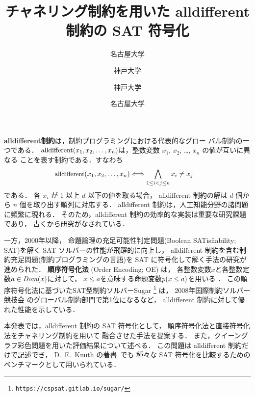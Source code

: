 \documentclass[uplatex,dvipdfmx,a4paper,twocolumn,base=11pt,jbase=11pt,ja=standard]{bxjsarticle}
\title{チャネリング制約を用いた alldifferent 制約の SAT 符号化}%
      {SAT Encoding of Alldifferent Constraints with Channeling Constraints}
\author{名古屋大学}{小菅 脩司}{Shuji Kosuge, Nagoya University}
\author{神戸大学}{宋 剛秀}{Takehide Soh, Kobe University}
\author{神戸大学}{田村 直之}{Naoyuki Tamura, Kobe University}
\author{名古屋大学}{番原 睦則}{Mutsunori Banbara, Nagoya University}
\begin{document}
\maketitle


\textbf{alldifferent制約}は，制約プログラミングにおける代表的なグロー
バル制約の一つである．
$\textrm{alldifferent}(x_1,x_2,\ldots,x_n)$は，整数変数 $x_1$, $x_2$, \ldots, $x_n$ の値が互いに異なる
ことを表す制約である．すなわち
\begin{align*}\small
  \textrm{alldifferent}(x_1,x_2,\ldots,x_n) & \Longleftrightarrow \bigwedge_{1 \le i < j \le n} x_i \ne x_j
\end{align*}
である．
各 $x_i$ が 1 以上 $d$ 以下の値を取る場合，
alldifferent 制約の解は $d$ 個から $n$ 個を取り出す順列に対応する．
alldifferent 制約は，人工知能分野の諸問題に頻繁に現れる．
そのため，alldifferent 制約の効率的な実装は重要な研究課題であり，
古くから研究がなされている．%


一方，2000年以降，
命題論理の充足可能性判定問題(Boolean SATisfiability; SAT)を解く
SAT ソルバーの性能が飛躍的に向上し，
alldifferent 制約を含む制約充足問題(制約プログラミングの言語)を
SAT に符号化して解く手法の研究が進められた．
\textbf{順序符号化法} (Order Encoding; OE) は，
各整数変数$x$と各整数定数$a \in {\it Dom}(x)$に対して，
$x\le a$を意味する命題変数$p(x\le a)$を用いる
\cite{DBLP:journals/constraints/TamuraTKB09}．
%
この順序符号化法に基づいたSAT型制約ソルバー{\sf Sugar}
\footnote{\texttt{https://cspsat.gitlab.io/sugar/}}
は，
2008年国際制約ソルバー競技会
のグローバル制約部門で第1位になるなど，
alldifferent 制約に対して優れた性能を示している．


本発表では，alldifferent 制約の SAT 符号化として，
順序符号化法と直接符号化法をチャネリング制約を用いて
融合させた手法を提案する．
また，クイーングラフ彩色問題を用いた評価結果について述べる．
この問題は alldifferent 制約だけで記述でき，
D.~E.~Knuth の著書~\cite{Knuth:TAOCP:SAT}でも
種々な SAT 符号化を比較するためのベンチマークとして用いられている．
\end{document}
